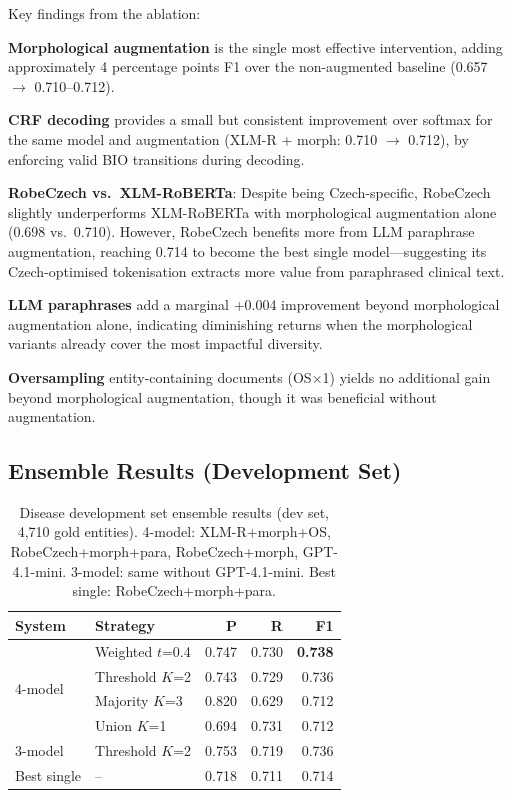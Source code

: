 \documentclass[11pt]{article}
\begin{document}
Key findings from the ablation:

\textbf{Morphological augmentation} is the single most effective intervention, adding
approximately 4 percentage points F1 over the non-augmented baseline (0.657 $\to$ 0.710--0.712).

\textbf{CRF decoding} provides a small but consistent improvement over softmax for the
same model and augmentation (XLM-R + morph: 0.710 $\to$ 0.712), by enforcing valid
BIO transitions during decoding.

\textbf{RobeCzech vs.\ XLM-RoBERTa}: Despite being Czech-specific, RobeCzech
slightly underperforms XLM-RoBERTa with morphological augmentation alone (0.698 vs.\ 0.710).
However, RobeCzech benefits more from LLM paraphrase augmentation, reaching
0.714 to become the best single model---suggesting its Czech-optimised tokenisation
extracts more value from paraphrased clinical text.

\textbf{LLM paraphrases} add a marginal +0.004 improvement beyond morphological augmentation
alone, indicating diminishing returns when the morphological variants already cover
the most impactful diversity.

\textbf{Oversampling} entity-containing documents (OS$\times$1) yields no additional gain
beyond morphological augmentation, though it was beneficial without augmentation.

\subsection{Ensemble Results (Development Set)}

\begin{table}[h]
\centering
\small
\begin{tabular}{llrrr}
\toprule
\textbf{System} & \textbf{Strategy} & \textbf{P} & \textbf{R} & \textbf{F1} \\
\midrule
\multirow{4}{*}{4-model}
  & Weighted $t$=0.4  & 0.747 & 0.730 & \textbf{0.738} \\
  & Threshold $K$=2   & 0.743 & 0.729 & 0.736 \\
  & Majority $K$=3    & 0.820 & 0.629 & 0.712 \\
  & Union $K$=1       & 0.694 & 0.731 & 0.712 \\
\midrule
3-model & Threshold $K$=2  & 0.753 & 0.719 & 0.736 \\
\midrule
Best single      & {--}             & 0.718 & 0.711 & 0.714 \\
\bottomrule
\end{tabular}
\caption{Disease development set ensemble results (dev set, 4,710 gold entities).
4-model: XLM-R+morph+OS, RobeCzech+morph+para, RobeCzech+morph, GPT-4.1-mini.
3-model: same without GPT-4.1-mini. Best single: RobeCzech+morph+para.}
\label{tab:ensemble}
\end{table}
\end{document}
